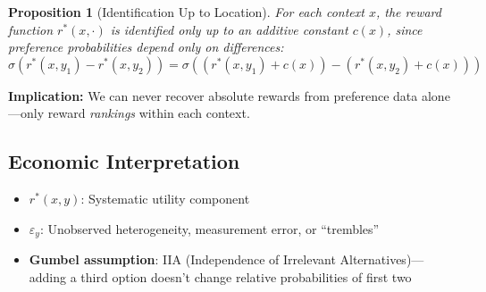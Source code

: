 \documentclass[11pt]{article}
\newcommand{\1}{\mathbf{1}}
\theoremstyle{plain}
\newtheorem{proposition}{Proposition}
\theoremstyle{definition}
\theoremstyle{remark}
\begin{document}
\begin{proposition}[Identification Up to Location]
For each context $x$, the reward function $r^*(x, \cdot)$ is identified only up to an additive constant $c(x)$, since preference probabilities depend only on differences:
$$
\sigma(r^*(x,y_1) - r^*(x,y_2)) = \sigma((r^*(x,y_1) + c(x)) - (r^*(x,y_2) + c(x)))
$$
\end{proposition}

\textbf{Implication:} We can never recover absolute rewards from preference data alone—only reward \emph{rankings} within each context.

\subsection*{Economic Interpretation}

\begin{itemize}
\item \textbf{$r^*(x,y)$}: Systematic utility component
\item \textbf{$\varepsilon_y$}: Unobserved heterogeneity, measurement error, or ``trembles''
\item \textbf{Gumbel assumption}: IIA (Independence of Irrelevant Alternatives)—adding a third option doesn't change relative probabilities of first two
\end{itemize}
\end{document}
